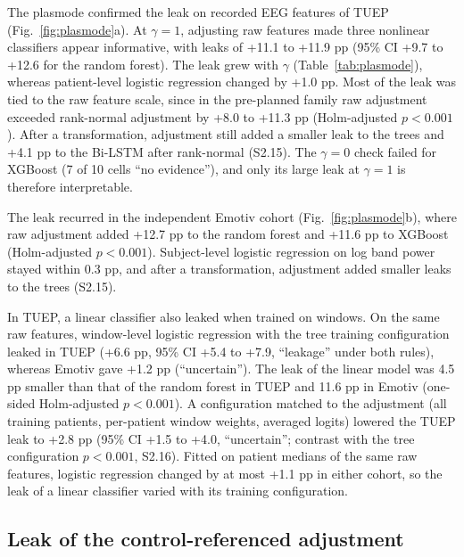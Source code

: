 \documentclass[final,1p,times]{elsarticle}
\newcommand{\figref}[1]{Fig.~\ref{#1}}
\newcommand{\tabref}[1]{Table~\ref{#1}}
\begin{document}
The plasmode confirmed the leak on recorded EEG features of TUEP (\figref{fig:plasmode}a). At $\gamma=1$, adjusting raw features made three nonlinear classifiers appear informative, with leaks of +11.1 to +11.9 pp (95\% CI +9.7 to +12.6 for the random forest). The leak grew with $\gamma$ (\tabref{tab:plasmode}), whereas patient-level logistic regression changed by +1.0 pp. Most of the leak was tied to the raw feature scale, since in the pre-planned family raw adjustment exceeded rank-normal adjustment by +8.0 to +11.3 pp (Holm-adjusted $p<0.001$). After a transformation, adjustment still added a smaller leak to the trees and +4.1 pp to the Bi-LSTM after rank-normal (S2.15). The $\gamma=0$ check failed for XGBoost (7 of 10 cells ``no evidence''), and only its large leak at $\gamma=1$ is therefore interpretable.

The leak recurred in the independent Emotiv cohort (\figref{fig:plasmode}b), where raw adjustment added +12.7 pp to the random forest and +11.6 pp to XGBoost (Holm-adjusted $p<0.001$). Subject-level logistic regression on log band power stayed within 0.3 pp, and after a transformation, adjustment added smaller leaks to the trees (S2.15).

In TUEP, a linear classifier also leaked when trained on windows. On the same raw features, window-level logistic regression with the tree training configuration leaked in TUEP (+6.6 pp, 95\% CI +5.4 to +7.9, ``leakage'' under both rules), whereas Emotiv gave +1.2 pp (``uncertain''). The leak of the linear model was 4.5 pp smaller than that of the random forest in TUEP and 11.6 pp in Emotiv (one-sided Holm-adjusted $p<0.001$). A configuration matched to the adjustment (all training patients, per-patient window weights, averaged logits) lowered the TUEP leak to +2.8 pp (95\% CI +1.5 to +4.0, ``uncertain''; contrast with the tree configuration $p<0.001$, S2.16). Fitted on patient medians of the same raw features, logistic regression changed by at most +1.1 pp in either cohort, so the leak of a linear classifier varied with its training configuration.

\subsection{Leak of the control-referenced adjustment}\label{sec:kebocoran}
\end{document}
